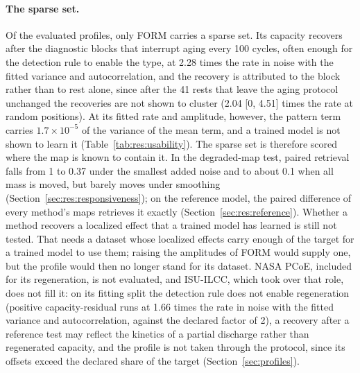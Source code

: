 \documentclass{article}
\begin{document}
\paragraph{The sparse set.}
Of the evaluated profiles, only FORM carries a sparse set. Its capacity recovers after the diagnostic blocks that interrupt aging every 100 cycles, often enough for the detection rule to enable the type, at 2.28 times the rate in noise with the fitted variance and autocorrelation, and the recovery is attributed to the block rather than to rest alone, since after the 41 rests that leave the aging protocol unchanged the recoveries are not shown to cluster (2.04 [0, 4.51] times the rate at random positions). At its fitted rate and amplitude, however, the pattern term carries $1.7\times10^{-5}$ of the variance of the mean term, and a trained model is not shown to learn it (Table~\ref{tab:res:usability}). The sparse set is therefore scored where the map is known to contain it. In the degraded-map test, paired retrieval falls from 1 to 0.37 under the smallest added noise and to about 0.1 when all mass is moved, but barely moves under smoothing (Section~\ref{sec:res:responsiveness}); on the reference model, the paired difference of every method's maps retrieves it exactly (Section~\ref{sec:res:reference}). Whether a method recovers a localized effect that a trained model has learned is still not tested. That needs a dataset whose localized effects carry enough of the target for a trained model to use them; raising the amplitudes of FORM would supply one, but the profile would then no longer stand for its dataset. NASA PCoE, included for its regeneration, is not evaluated, and ISU-ILCC, which took over that role, does not fill it: on its fitting split the detection rule does not enable regeneration (positive capacity-residual runs at 1.66 times the rate in noise with the fitted variance and autocorrelation, against the declared factor of 2), a recovery after a reference test may reflect the kinetics of a partial discharge rather than regenerated capacity, and the profile is not taken through the protocol, since its offsets exceed the declared share of the target (Section~\ref{sec:profiles}).
\end{document}
